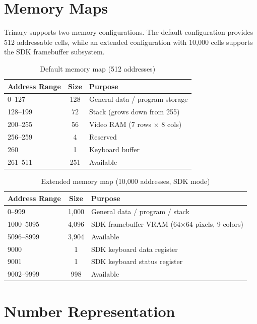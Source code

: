 \documentclass[10pt,a4paper,twoside]{book}
\begin{document}
\section{Memory Maps}

Trinary supports two memory configurations. The default configuration provides 512
addressable cells, while an extended configuration with 10,000 cells supports the
SDK framebuffer subsystem.

\begin{table}[H]
\centering
\caption{Default memory map (512 addresses)}
\label{tab:memmap_default}
\begin{tabular}{lcl}
\toprule
Address Range & Size & Purpose \\
\midrule
0--127 & 128 & General data / program storage \\
128--199 & 72 & Stack (grows down from 255) \\
200--255 & 56 & Video RAM (7 rows $\times$ 8 cols) \\
256--259 & 4  & Reserved \\
260      & 1  & Keyboard buffer \\
261--511 & 251 & Available \\
\bottomrule
\end{tabular}
\end{table}

\begin{table}[H]
\centering
\caption{Extended memory map (10,000 addresses, SDK mode)}
\label{tab:memmap_extended}
\begin{tabular}{lcl}
\toprule
Address Range & Size & Purpose \\
\midrule
0--999    & 1,000 & General data / program / stack \\
1000--5095 & 4,096 & SDK framebuffer VRAM (64$\times$64 pixels, 9 colors) \\
5096--8999 & 3,904 & Available \\
9000      & 1     & SDK keyboard data register \\
9001      & 1     & SDK keyboard status register \\
9002--9999 & 998   & Available \\
\bottomrule
\end{tabular}
\end{table}

\section{Number Representation}
\end{document}
